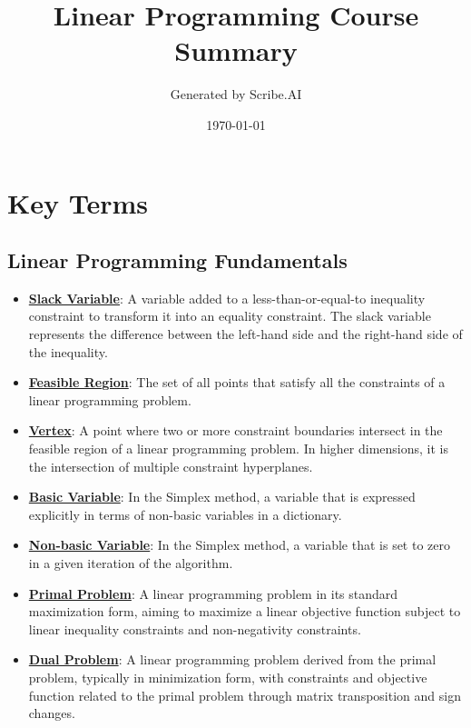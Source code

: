 \documentclass{article}%
\title{Linear Programming Course Summary}%
\author{Generated by Scribe.AI}%
\date{\today}%
\begin{document}
%
\normalsize%
\maketitle%
\section{Key Terms}%
\label{sec:KeyTerms}%
\subsection{Linear Programming Fundamentals}%
\label{subsec:LinearProgrammingFundamentals}%
\begin{itemize}[leftmargin=*]%
\item \href{https://www.math.purdue.edu/~yipn/421//2024-08-27-ExSimplex.pdf#page=1}{\textbf{Slack Variable}}: A variable added to a less-than-or-equal-to inequality constraint to transform it into an equality constraint.  The slack variable represents the difference between the left-hand side and the right-hand side of the inequality.%
\item \href{https://www.math.purdue.edu/~yipn/421//2024-08-27-ExSimplex.pdf#page=4}{\textbf{Feasible Region}}: The set of all points that satisfy all the constraints of a linear programming problem.%
\item \href{https://www.math.purdue.edu/~yipn/421//2024-08-27-ExSimplex.pdf#page=5}{\textbf{Vertex}}: A point where two or more constraint boundaries intersect in the feasible region of a linear programming problem.  In higher dimensions, it is the intersection of multiple constraint hyperplanes.%
\item \href{https://www.math.purdue.edu/~yipn/421//2024-08-27-ExSimplex.pdf#page=6}{\textbf{Basic Variable}}: In the Simplex method, a variable that is expressed explicitly in terms of non-basic variables in a dictionary.%
\item \href{https://www.math.purdue.edu/~yipn/421//2024-08-27-ExSimplex.pdf#page=6}{\textbf{Non-basic Variable}}: In the Simplex method, a variable that is set to zero in a given iteration of the algorithm.%
\item \href{https://www.math.purdue.edu/~yipn/421//2024-09-12-Duality.pdf#page=1}{\textbf{Primal Problem}}: A linear programming problem in its standard maximization form, aiming to maximize a linear objective function subject to linear inequality constraints and non-negativity constraints.%
\item \href{https://www.math.purdue.edu/~yipn/421//2024-09-12-Duality.pdf#page=1}{\textbf{Dual Problem}}: A linear programming problem derived from the primal problem, typically in minimization form, with constraints and objective function related to the primal problem through matrix transposition and sign changes.%

\end{itemize}
\end{document}
